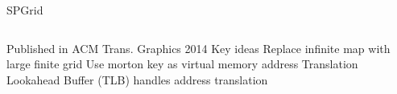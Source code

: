 \begin{frame}{SPGrid}
\begin{columns}
\centering
\begin{outline}
    \1 Published in ACM Trans. Graphics 2014 \cite{Setaluri2014}
    \1 Key ideas
      \2 Replace infinite map with large finite grid
      \2 Use morton key as virtual memory address
      \2 Translation Lookahead Buffer (TLB) handles address translation
\end{outline}
\centering
{}


\end{columns}

\end{frame}

